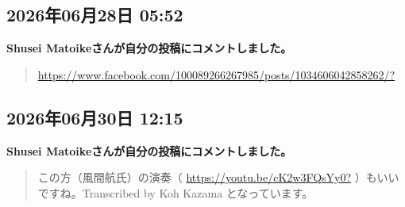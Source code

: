 \subsection*{2026年06月28日 05:52}

\textbf{Shusei Matoikeさんが自分の投稿にコメントしました。}

\begin{quote}
\url{https://www.facebook.com/100089266267985/posts/1034606042858262/?}
\end{quote}

\subsection*{2026年06月30日 12:15}

\textbf{Shusei Matoikeさんが自分の投稿にコメントしました。}

\begin{quote}
この方（風間航氏）の演奏（ \url{https://youtu.be/cK2w3FQsYy0?} ）もいいですね。Transcribed by Koh Kazama となっています。
\end{quote}

